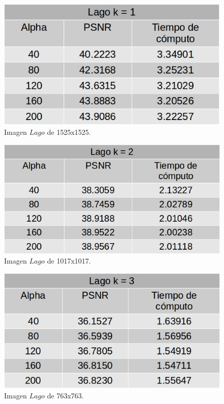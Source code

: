 \documentclass[a4paper]{article}
\begin{document}
    
           \begin{figure}[H]
    \centering
    \includegraphics[scale=0.4]{imagenes/lago1.jpg}
    \caption{Imagen $Lago$ de 1525x1525.}
	\label{lagoe}
    \end{figure}
    
        \begin{figure}[H]
    \centering
    \includegraphics[scale=0.4]{imagenes/lago2.jpg}
    \caption{Imagen $Lago$ de 1017x1017.}
	\label{lagoe}
    \end{figure}
    
        \begin{figure}[H]
    \centering
    \includegraphics[scale=0.4]{imagenes/lago3.jpg}
    \caption{Imagen $Lago$ de 763x763.}
	\label{lagoe}
    \end{figure}
    
\end{document}
